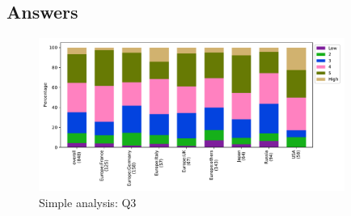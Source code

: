 
\subsection{Answers}


\begin{figure}[htb]
\begin{center}
\includegraphics[width=10cm]{../pdfs/Q3.pdf}
\caption{Simple analysis: Q3}
\label{fig:Q3}
\end{center}
\end{figure}

